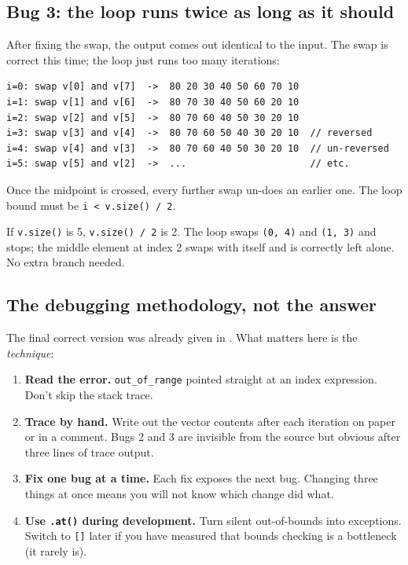 \documentclass[11pt]{article}
\begin{document}
\subsection{Bug 3: the loop runs twice as long as it should}

After fixing the swap, the output comes out identical to the input. The
swap is correct this time; the loop just runs too many iterations:

\begin{examplebox}
\begin{verbatim}
i=0: swap v[0] and v[7]  ->  80 20 30 40 50 60 70 10
i=1: swap v[1] and v[6]  ->  80 70 30 40 50 60 20 10
i=2: swap v[2] and v[5]  ->  80 70 60 40 50 30 20 10
i=3: swap v[3] and v[4]  ->  80 70 60 50 40 30 20 10  // reversed
i=4: swap v[4] and v[3]  ->  80 70 60 40 50 30 20 10  // un-reversed
i=5: swap v[5] and v[2]  ->  ...                      // etc.
\end{verbatim}
Once the midpoint is crossed, every further swap un-does an earlier one.
The loop bound must be \texttt{i < v.size() / 2}.
\end{examplebox}

\begin{warnbox}
If \texttt{v.size()} is 5, \texttt{v.size() / 2} is 2. The loop swaps
\texttt{(0, 4)} and \texttt{(1, 3)} and stops; the middle element at
index 2 swaps with itself and is correctly left alone. No extra branch
needed.
\end{warnbox}

\subsection{The debugging methodology, not the answer}

The final correct version was already given in . What
matters here is the \emph{technique}:

\begin{enumerate}[leftmargin=*]
    \item \textbf{Read the error.} \texttt{out\_of\_range} pointed straight
          at an index expression. Don't skip the stack trace.
    \item \textbf{Trace by hand.} Write out the vector contents after each
          iteration on paper or in a comment. Bugs 2 and 3 are invisible
          from the source but obvious after three lines of trace output.
    \item \textbf{Fix one bug at a time.} Each fix exposes the next bug.
          Changing three things at once means you will not know which
          change did what.
    \item \textbf{Use \texttt{.at()} during development.} Turn silent
          out-of-bounds into exceptions. Switch to \texttt{[]} later if
          you have measured that bounds checking is a bottleneck (it
          rarely is).
\end{enumerate}
\end{document}
